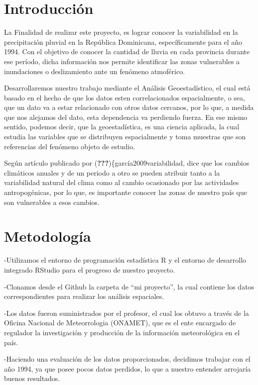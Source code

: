 \documentclass[11pt,]{article}
\begin{document}
\vskip 6.5pt


\noindent  \section{Introducción}\label{introducciuxf3n}

La Finalidad de realizar este proyecto, es lograr conocer la
variabilidad en la precipitación pluvial en la República Dominicana,
específicamente para el año 1994. Con el objetivo de conocer la cantidad
de lluvia en cada provincia durante ese período, dicha información nos
permite identificar las zonas vulnerables a inundaciones o deslizamiento
ante un fenómeno atmoférico.

Desarrollaremos nuestro trabajo mediante el Análisis Geoestadístico, el
cual está basado en el hecho de que los datos esten correlacionados
espacialmente, o sea, que un dato va a estar relacionado con otros datos
cercanos, por lo que, a medida que nos alejamos del dato, esta
dependencia va perdiendo fuerza. En ese mismo sentido, podemos decir,
que la geoestadística, es una ciencia aplicada, la cual estudia las
variables que se distribuyen espacialmente y toma muestras que son
referencias del fenómeno objeto de estudio.

Según artículo publicado por ({\textbf{???}})\{garcía2009variabilidad,
dice que los cambios climáticos anuales y de un periodo a otro se pueden
atribuir tanto a la variabilidad natural del clima como al cambio
ocasionado por las actividades antropogénicas, por lo que, es importante
conocer las zonas de nuestro país que son vulnerables a esos cambios.

\section{Metodología}\label{metodologuxeda}

-Utilizamos el entorno de programación estadística R y el entorno de
desarrollo integrado RStudio para el progreso de nuestro proyecto.

-Clonamos desde el Github la carpeta de ``mi proyecto'', la cual
contiene los datos correspondientes para realizar los análisis
espaciales.

-Los datos fueron suministrados por el profesor, el cual los obtuvo a
través de la Oficina Nacional de Meteorrologia (ONAMET), que es el ente
encargado de regulador la investigación y producción de la información
meteorológica en el país.

-Haciendo una evaluación de los datos proporcionados, decidimos trabajar
con el año 1994, ya que posee pocos datos perdidos, lo que a nuestro
entender arrojaría buenos resultados.
\end{document}
